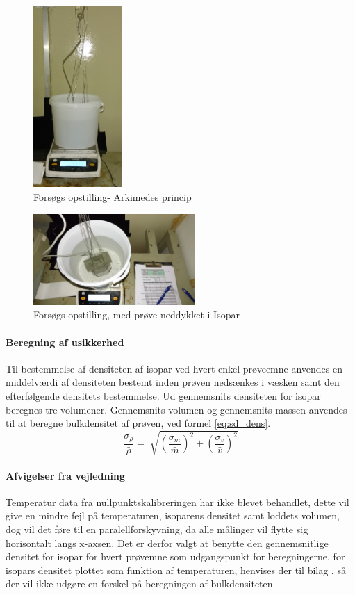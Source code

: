%
\begin{figure}
\centering
\includegraphics[width=0.30\textwidth]{ark_opst_red}
\caption{Forsøgs opstilling- Arkimedes princip}
\label{fig:ark_opst}
\end{figure}
%
\begin{figure}
\centering
\includegraphics[angle=180,width=0.55\textwidth]{ark_prove}
\caption{Forsøgs opstilling, med prøve neddykket i Isopar}
\label{fig:ark_opst_prove}
\end{figure}
%
\paragraph{Beregning af usikkerhed}
Til bestemmelse af densiteten af isopar ved hvert enkel prøveemne anvendes en middelværdi af densiteten bestemt inden prøven nedsænkes i væsken samt den efterfølgende densitets bestemmelse. Ud gennemsnits densiteten for isopar beregnes tre volumener. Gennemsnits volumen og gennemsnits massen anvendes til at beregne bulkdensitet af prøven, ved formel \vref{eq:sd_dens}. 
%
\begin{equation}
\label{eq:sd_dens}
\frac{\sigma_\rho}{\bar{\rho}}=\sqrt[]{(\frac{\sigma_m}{\bar{m}})^2+(\frac{\sigma_v}{\bar{v}})^2}
\end{equation}
%
\paragraph{Afvigelser fra vejledning} Temperatur data fra nullpunktskalibreringen har ikke blevet behandlet, dette vil give en mindre fejl på temperaturen, isoparens densitet samt loddets volumen, dog vil det føre til en paralellforskyvning, da alle målinger vil flytte sig horisontalt langs x-axsen. Det er derfor valgt at benytte den gennemsnitlige densitet for isopar for hvert prøvemne som udgangspunkt for beregningerne, for isopars densitet plottet som funktion af temperaturen, henvises der til bilag .  så der vil ikke udgøre en forskel på beregningen af bulkdensiteten. 
